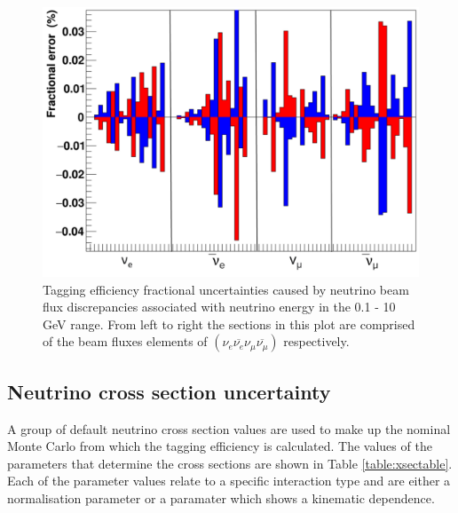 \begin{figure}[!htb]
    \centering
\includegraphics[width=\textwidth]{Figures/flux_uncertainty.png}
\caption{Tagging efficiency fractional uncertainties caused by neutrino beam flux discrepancies associated with neutrino energy in the 0.1 - 10 GeV range. From left to right the sections in this plot are comprised of the beam fluxes elements of $\left(\nu_{e} \overline{\nu_{e}} \nu_{\mu} \overline{\nu_{\mu}}\right)$ respectively.}
\label{fig:fluxuncertainty}
\end{figure}

\subsection{Neutrino cross section uncertainty}

A group of default neutrino cross section values are used to make up the nominal Monte Carlo from which the tagging efficiency is calculated. The values of the parameters that determine the cross sections are shown in Table \ref{table:xsectable}. Each of the parameter values relate to a specific interaction type and are either a normalisation parameter or a paramater which shows a kinematic dependence. \newline

